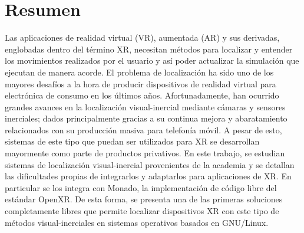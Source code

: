 \begingroup
\let\clearpage\relax
\let\cleardoublepage\relax
\let\cleardoublepage\relax

\chapter*{Resumen}

Las aplicaciones de realidad virtual (VR), aumentada (AR) y sus derivadas,
englobadas dentro del término XR, necesitan métodos para localizar y entender
los movimientos realizados por el usuario y así poder actualizar la simulación
que ejecutan de manera acorde. El problema de localización ha sido uno de los
mayores desafíos a la hora de producir dispositivos de realidad virtual para
electrónica de consumo en los últimos años. Afortunadamente, han ocurrido
grandes avances en la localización visual-inercial mediante cámaras y sensores
inerciales; dados principalmente gracias a su continua mejora y abaratamiento
relacionados con su producción masiva para telefonía móvil. A pesar de esto,
sistemas de este tipo que puedan ser utilizados para XR se desarrollan
mayormente como parte de productos privativos. En este trabajo, se estudian
sistemas de localización visual-inercial provenientes de la academia y se
detallan las dificultades propias de integrarlos y adaptarlos para aplicaciones
de XR. En particular se los integra con Monado, la implementación de código
libre del estándar OpenXR. De esta forma, se presenta una de las primeras
soluciones completamente libres que permite localizar dispositivos XR con este
tipo de métodos visual-inerciales en sistemas operativos basados en GNU/Linux.

\vfill

